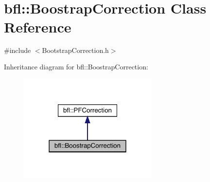 \hypertarget{classbfl_1_1BoostrapCorrection}{}\section{bfl\+:\+:Boostrap\+Correction Class Reference}
\label{classbfl_1_1BoostrapCorrection}


{\ttfamily \#include $<$Bootstrap\+Correction.\+h$>$}



Inheritance diagram for bfl\+:\+:Boostrap\+Correction\+:
\nopagebreak
\begin{figure}[H]
\begin{center}
\leavevmode
\includegraphics[width=198pt]{classbfl_1_1BoostrapCorrection__inherit__graph}
\end{center}
\end{figure}
